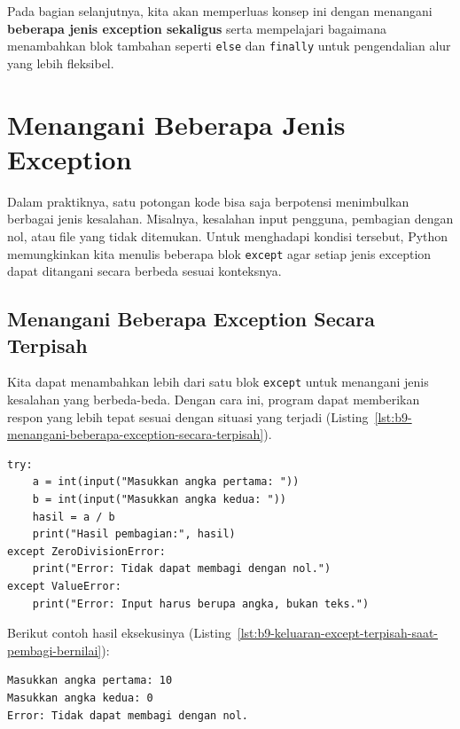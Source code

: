 Pada bagian selanjutnya, kita akan memperluas konsep ini dengan menangani \textbf{beberapa jenis exception sekaligus} serta mempelajari bagaimana menambahkan blok tambahan seperti \texttt{else} dan \texttt{finally} untuk pengendalian alur yang lebih fleksibel.


\section{Menangani Beberapa Jenis Exception}

Dalam praktiknya, satu potongan kode bisa saja berpotensi menimbulkan berbagai jenis kesalahan. Misalnya, kesalahan input pengguna, pembagian dengan nol, atau file yang tidak ditemukan. Untuk menghadapi kondisi tersebut, Python memungkinkan kita menulis beberapa blok \texttt{except} agar setiap jenis exception dapat ditangani secara berbeda sesuai konteksnya.

\subsection*{Menangani Beberapa Exception Secara Terpisah}

Kita dapat menambahkan lebih dari satu blok \texttt{except} untuk menangani jenis kesalahan yang berbeda-beda. Dengan cara ini, program dapat memberikan respon yang lebih tepat sesuai dengan situasi yang terjadi (Listing~\ref{lst:b9-menangani-beberapa-exception-secara-terpisah}).

\begin{lstlisting}[style=PythonStyle, caption={Menangani beberapa exception secara terpisah}, label={lst:b9-menangani-beberapa-exception-secara-terpisah}]
try:
    a = int(input("Masukkan angka pertama: "))
    b = int(input("Masukkan angka kedua: "))
    hasil = a / b
    print("Hasil pembagian:", hasil)
except ZeroDivisionError:
    print("Error: Tidak dapat membagi dengan nol.")
except ValueError:
    print("Error: Input harus berupa angka, bukan teks.")
\end{lstlisting}

Berikut contoh hasil eksekusinya (Listing~\ref{lst:b9-keluaran-except-terpisah-saat-pembagi-bernilai}):

\begin{lstlisting}[language=bash, caption={Keluaran except terpisah saat pembagi bernilai nol}, label={lst:b9-keluaran-except-terpisah-saat-pembagi-bernilai}]
Masukkan angka pertama: 10
Masukkan angka kedua: 0
Error: Tidak dapat membagi dengan nol.
\end{lstlisting}


